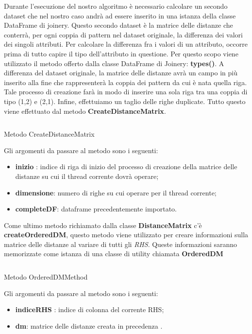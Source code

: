 Durante l'esecuzione del nostro algoritmo è necessario calcolare un secondo dataset che nel nostro caso andrà ad essere inserito in una istanza della classe DataFrame di joinery.
Questo secondo dataset è la matrice delle distanze che conterrà, per ogni coppia di pattern nel dataset originale, la differenza dei valori dei singoli attributi.
Per calcolare la differenza fra i valori di un attributo, occorre prima di tutto capire il tipo dell'attributo in questione. Per questo scopo viene utilizzato il metodo offerto dalla classe DataFrame di Joinery: \textbf{types()}.
A differenza del dataset originale, la matrice delle distanze avrà un campo in più inserito alla fine che rappresenterà la coppia dei pattern da cui è nata quella riga.
Tale processo di creazione farà in modo di inserire una sola riga tra una coppia di tipo (1,2) e (2,1).
Infine, effettuiamo un taglio delle righe duplicate.
Tutto questo viene effettuato dal metodo \textbf{CreateDistanceMatrix}.
\begin{listing}[H]
	\inputminted[]{java}{Codici/CreateDistanceMatrix.java}
	\caption{Metodo CreateDistanceMatrix}
	\label{Code:2}
\end{listing}
Gli argomenti da passare al metodo sono i seguenti:
\begin{itemize}
	\item \textbf{inizio} : indice di riga di inizio del processo di creazione della matrice delle distanze su cui il thread corrente dovrà operare;
	\item \textbf{dimensione}: numero di righe su cui operare per il thread corrente;
	\item \textbf{completeDF}: dataframe precedentemente importato.
\end{itemize}
Come ultimo metodo richiamato dalla classe \textbf{DistanceMatrix} c'è \textbf{createOrderedDM}, questo metodo viene utilizzato per creare informazioni sulla matrice delle distanze al variare di tutti gli \emph{RHS}.
Queste informazioni saranno memorizzate come istanza di una classe di utility chiamata \textbf{OrderedDM}
\begin{listing}[H]
	\inputminted[]{java}{Codici/OrderedDMMethod.java}
	\caption{Metodo OrderedDMMethod}
	\label{Code:3}
\end{listing}
Gli argomenti da passare al metodo sono i seguenti:
\begin{itemize}
	\item \textbf{indiceRHS} : indice di colonna del corrente RHS;
	\item \textbf{dm}: matrice delle distanze creata in precedenza .
\end{itemize}
